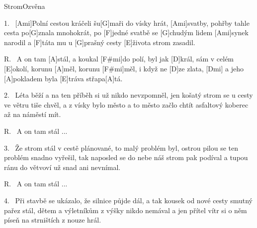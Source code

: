 \begin{song}{Strom}{Ozvěna}

\begin{xverse}{1.~}
[\large Ami]Polní cestou kráčeli šu[\large G]maři do vísky hrát,
[\large Ami]svatby, pohřby tahle cesta po[\large G]znala mnohokrát,
po [\large F]jedné svatbě se [\large G]chudým lidem [\large Ami]synek narodil
a [\large F]táta mu u [\large G]prašný cesty [\large E]{}života strom zasadil.
\end{xverse}

\begin{xverse}{R.~}
A on tam [\large A]stál, a koukal [\large F#mi]do polí,
byl jak [\large D]král, sám v celém [\large E]okolí,
korunu [\large A]měl, korunu [\large F#mi]měl, i když ne [\large D]ze zlata, [\large Dmi]{}
a jeho [\large A]pokladem byla [\large E]tráva střapa[\large A]tá.
\end{xverse}

\begin{xverse}{2.~}
Léta běží a na ten příběh si už nikdo nevzpomněl,
jen košatý strom se u cesty ve větru tiše chvěl,
a z vísky bylo město a to město začlo chtít
asfaltový koberec až na náměstí mít.
\end{xverse}

\begin{xverse}{R.~}
A on tam stál ...
\end{xverse}

\begin{xverse}{3.~}
Že strom stál v cestě plánované, to malý problém byl,
ostrou pilou se ten problém snadno vyřešil,
tak naposled se do nebe náš strom pak podíval
a tupou ránu do větvoví už snad ani nevnímal.
\end{xverse}

\begin{xverse}{R.~}
A on tam stál ...
\end{xverse}


\begin{xverse}{4.~}
Při stavbě se ukázalo, že silnice půjde dál,
a tak kousek od nové cesty smutný pařez stál,
dětem a výletníkům z výšky nikdo nemával
a jen přítel vítr si o něm píseň na strništích z nouze hrál.
\end{xverse}



\end{song}

